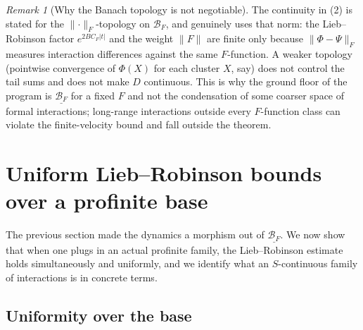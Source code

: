 \documentclass[12pt]{article}
\newcommand{\cond}[1]{\underline{#1}}          %
\newcommand{\Ffun}{F}                          %
\newcommand{\BF}{\mathcal{B}_{F}}              %
\newcommand{\norm}[1]{\lVert #1\rVert}
\newcommand{\Fnorm}[1]{\lVert #1\rVert_{F}}
\theoremstyle{definition}
\theoremstyle{remark}
\newtheorem{remark}[theorem]{Remark}
\begin{document}
\begin{remark}[Why the Banach topology is not negotiable]
\label{rem:banach-topology}
The continuity in (2) is stated for the $\Fnorm{\cdot}$-topology
on $\BF$, and  genuinely uses that norm: the Lieb--Robinson
factor $e^{2BC_\Ffun\lvert t\rvert}$ and the weight $\norm{\Ffun}$ are finite only because
$\Fnorm{\Phi-\Psi}$ measures interaction differences against the same $\Ffun$-function. A
weaker topology (pointwise convergence of $\Phi(X)$ for each cluster $X$, say) does not
control the tail sums and does not make $D$ continuous. This is why the ground floor of the
program is $\cond{\BF}$ for a fixed $\Ffun$ and not the condensation of some coarser space of
formal interactions; long-range interactions outside every $\Ffun$-function class can violate
the finite-velocity bound and fall outside the theorem.
\end{remark}

\section{Uniform Lieb--Robinson bounds over a profinite base}
\label{sec:uniform}

The previous section made the dynamics a morphism out of $\cond{\BF}$. We now show that when
one plugs in an actual profinite family, the Lieb--Robinson estimate holds simultaneously and
uniformly, and we identify what an $S$-continuous family of interactions is in concrete terms.

\subsection{Uniformity over the base}
\label{sec:uniform-bound}
\end{document}
